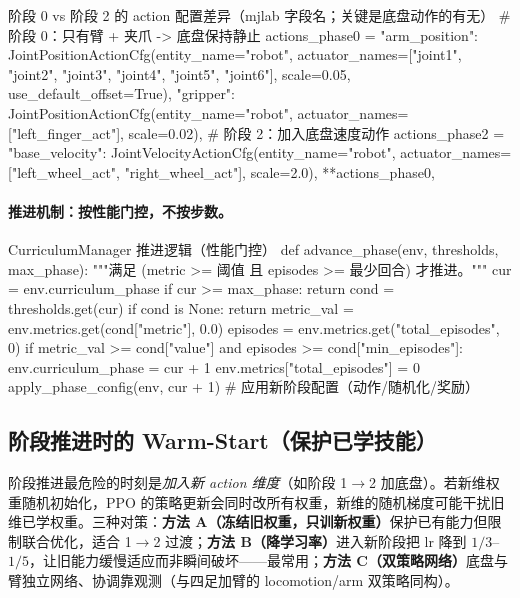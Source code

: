 \begin{codebox}[Python]{阶段 0 vs 阶段 2 的 action 配置差异（mjlab 字段名；关键是底盘动作的有无）}
# 阶段 0：只有臂 + 夹爪 -> 底盘保持静止
actions_phase0 = {
    "arm_position": JointPositionActionCfg(entity_name="robot",
        actuator_names=["joint1", "joint2", "joint3", "joint4", "joint5", "joint6"],
        scale=0.05, use_default_offset=True),
    "gripper": JointPositionActionCfg(entity_name="robot",
        actuator_names=["left_finger_act"], scale=0.02),
}
# 阶段 2：加入底盘速度动作
actions_phase2 = {
    "base_velocity": JointVelocityActionCfg(entity_name="robot",
        actuator_names=["left_wheel_act", "right_wheel_act"], scale=2.0),
    **actions_phase0,
}
\end{codebox}

\paragraph{推进机制：按性能门控，不按步数。}

\begin{codebox}[Python]{CurriculumManager 推进逻辑（性能门控）}
def advance_phase(env, thresholds, max_phase):
    """满足 (metric >= 阈值 且 episodes >= 最少回合) 才推进。"""
    cur = env.curriculum_phase
    if cur >= max_phase:
        return
    cond = thresholds.get(cur)
    if cond is None:
        return
    metric_val = env.metrics.get(cond["metric"], 0.0)
    episodes   = env.metrics.get("total_episodes", 0)
    if metric_val >= cond["value"] and episodes >= cond["min_episodes"]:
        env.curriculum_phase = cur + 1
        env.metrics["total_episodes"] = 0
        apply_phase_config(env, cur + 1)   # 应用新阶段配置（动作/随机化/奖励）
\end{codebox}

\subsection{阶段推进时的 Warm-Start（保护已学技能）}
\label{sec:rlmc-wh-warmstart}

阶段推进最危险的时刻是\emph{加入新 action 维度}（如阶段 1$\to$2 加底盘）。若新维权重随机初始化，PPO 的策略更新会同时改所有权重，新维的随机梯度可能干扰旧维已学权重。三种对策：\textbf{方法 A（冻结旧权重，只训新权重）}保护已有能力但限制联合优化，适合 1$\to$2 过渡；\textbf{方法 B（降学习率）}进入新阶段把 lr 降到 $1/3$--$1/5$，让旧能力缓慢适应而非瞬间破坏——最常用；\textbf{方法 C（双策略网络）}底盘与臂独立网络、协调靠观测（与四足加臂的 locomotion/arm 双策略同构）。

